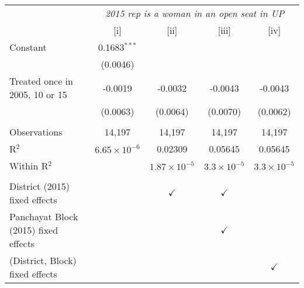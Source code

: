 
\begingroup
\centering
\begin{tabular}{lcccc}
   \toprule
    & \multicolumn{4}{c}{\textit{2015 rep is a woman in an open seat in UP}}\\
                                        & [i]                   & [ii]                  & [iii]                & [iv]\\  
   \midrule 
   Constant                             & 0.1683$^{***}$        &                       &                      &   \\   
                                        & (0.0046)              &                       &                      &   \\   
   Treated once in 2005, 10 or 15       & -0.0019               & -0.0032               & -0.0043              & -0.0043\\   
                                        & (0.0063)              & (0.0064)              & (0.0070)             & (0.0062)\\   
    \\
   Observations                         & 14,197                & 14,197                & 14,197               & 14,197\\  
   R$^2$                                & $6.65\times 10^{-6}$  & 0.02309               & 0.05645              & 0.05645\\  
   Within R$^2$                         &                       & $1.87\times 10^{-5}$  & $3.3\times 10^{-5}$  & $3.3\times 10^{-5}$\\   
    \\
   District (2015) fixed effects        &                       & $\checkmark$          & $\checkmark$         & \\  
   Panchayat Block (2015) fixed effects &                       &                       & $\checkmark$         & \\  
   (District, Block) fixed effects      &                       &                       &                      & $\checkmark$\\   
   \bottomrule
\end{tabular}
\par\endgroup


